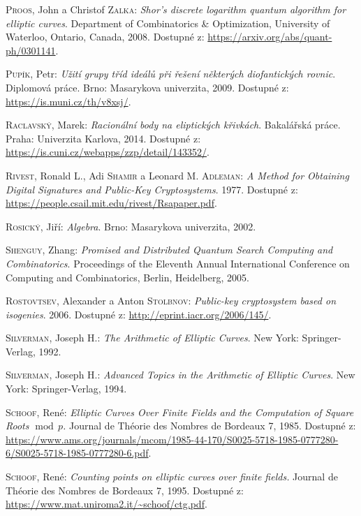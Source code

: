 \documentclass[12pt]{report}
\begin{document}
\begin{thebibliography}{97}
\textsc{Proos}, John a Christof \textsc{Zalka}: \textit{Shor’s discrete logarithm quantum algorithm for elliptic curves}. Department of Combinatorics \& Optimization, University of Waterloo,  Ontario, Canada, 2008. Dostupné z: \url{https://arxiv.org/abs/quant-ph/0301141}.

\textsc{Pupík}, Petr: \textit{Užití grupy tříd ideálů při řešení některých diofantických rovnic}. Diplomová práce. Brno: Masarykova univerzita, 2009. Dostupné z: \url{https://is.muni.cz/th/v8xsj/}.

\textsc{Raclavský}, Marek: \textit{Racionální body na eliptických křivkách}. Bakalářská práce. Praha: Univerzita Karlova, 2014. Dostupné z: \url{https://is.cuni.cz/webapps/zzp/detail/143352/}.

\textsc{Rivest}, Ronald L., Adi \textsc{Shamir} a Leonard M. \textsc{Adleman}: \textit{A Method for Obtaining Digital Signatures and Public-Key Cryptosystems}. 1977. Dostupné z: \url{https://people.csail.mit.edu/rivest/Rsapaper.pdf}. 

\textsc{Rosický}, Jiří: \textit{Algebra}. Brno: Masarykova univerzita, 2002.

\textsc{Shenguy}, Zhang: \textit{Promised and Distributed Quantum Search Computing and Combinatorics}. Proceedings of the Eleventh  Annual  International Conference on Computing  and Combinatorics, Berlin, Heidelberg, 2005.

\textsc{Rostovtsev}, Alexander a Anton \textsc{Stolbnov}:\textit{ Public-key cryptosystem based on isogenies}. 2006. Dostupné z: \url{http://eprint.iacr.org/2006/145/}. 

\textsc{Silverman}, Joseph H.: \textit{The Arithmetic of Elliptic Curves}. New York: Springer-Verlag, 1992. 

\textsc{Silverman}, Joseph H.: \textit{Advanced Topics in the Arithmetic of Elliptic Curves}. New York: Springer-Verlag, 1994. 


\textsc{Schoof}, René: \textit{Elliptic Curves Over Finite Fields and the Computation of Square Roots $\! \operatorname{mod} \, p$.} Journal de Théorie des Nombres de Bordeaux 7, 1985. Dostupné z: \url{https://www.ams.org/journals/mcom/1985-44-170/S0025-5718-1985-0777280-6/S0025-5718-1985-0777280-6.pdf}.

\textsc{Schoof}, René: \textit{Counting points on elliptic curves over finite fields.} Journal de Théorie des Nombres de Bordeaux 7, 1995. Dostupné z: \url{https://www.mat.uniroma2.it/~schoof/ctg.pdf}.


\end{thebibliography}
\end{document}
